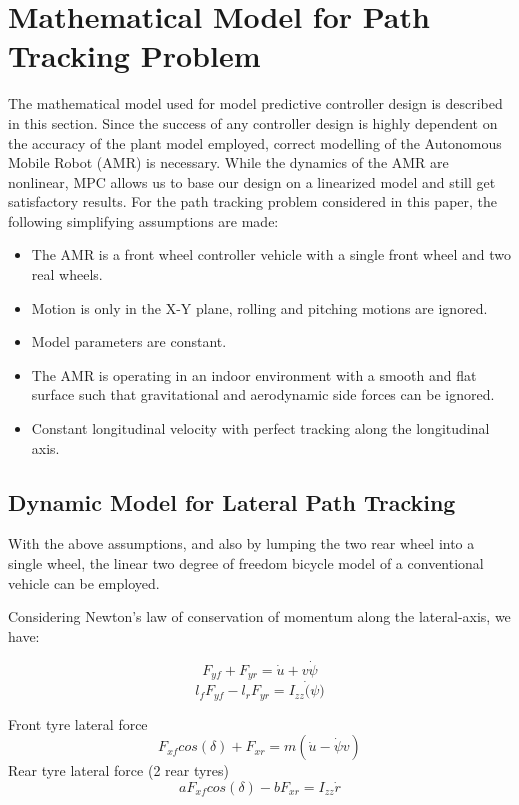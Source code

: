 \documentclass[a4paper, twocolumn]{article}
\begin{document}
\section{Mathematical Model for Path Tracking Problem}

The mathematical model used for model predictive controller design is described in this section. Since the success of any controller design is highly 
dependent on the accuracy of the plant model employed, correct modelling of the Autonomous Mobile Robot (AMR) is necessary. While the dynamics of the 
AMR are nonlinear, MPC allows us to base our design on a linearized model and still get satisfactory results. For the path tracking problem considered 
in this paper, the following simplifying assumptions are made:
\begin{itemize}
    \item The AMR is a front wheel controller vehicle with a single front wheel and two real wheels.
    \item Motion is only in the X-Y plane, rolling and pitching motions are ignored.
    \item Model parameters are constant.
    \item The AMR is operating in an indoor environment with a smooth and flat surface such that gravitational and aerodynamic side forces can be ignored.
    \item Constant longitudinal velocity with perfect tracking along the longitudinal axis.
\end{itemize}

\subsection{Dynamic Model for Lateral Path Tracking}
With the above assumptions, and also by lumping the two rear wheel into a single wheel, the linear two degree of freedom bicycle model of a 
conventional vehicle can be employed.

\noindent
Considering Newton's law of conservation of momentum along the lateral-axis, we have:

$$F_{yf} + F_{yr}= \dot{u} + v\dot{\psi}$$
$$l_f F_{yf} - l_r F_{yr}= I_{zz} \dot(\psi) $$

\noindent
Front tyre lateral force
$$
F_{xf}cos(\delta) + F_{xr}= m(\dot{u} - \dot{\psi}v)
$$
Rear tyre lateral force (2 rear tyres)
$$
aF_{xf}cos(\delta) - bF_{xr}= I_{zz}\dot{r}
$$
\end{document}
